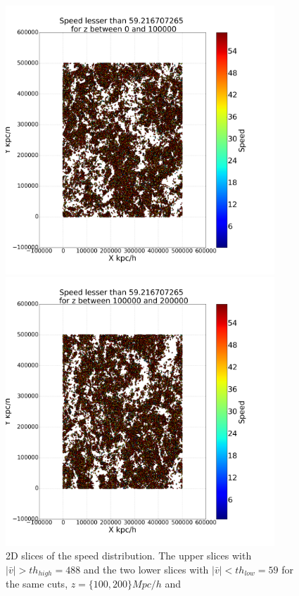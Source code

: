 \documentclass[12pt]{article}
\begin{document}
\begin{figure}[ht]
\begin{minipage}{.45\textwidth}
\end{minipage}
\begin{minipage}{.45\textwidth}
  \centering
  \includegraphics[width=0.9\textwidth]{graphs/scatter_magnitud_vel_59_lz_100000.png}
\end{minipage}
\begin{minipage}{.45\textwidth}
  \centering
  \includegraphics[width=0.9\textwidth]{graphs/scatter_magnitud_vel_59_lz_200000.png}
\end{minipage}
\caption{2D slices of the speed distribution. The upper slices with $|\bar{v}| > th_{high} = 488$ and the two lower slices with $|\bar{v}| < th_{low} = 59$ for the same cuts, $z = \{100, 200 \} Mpc/h$ and }\label{fig:2D_slices_thresh}
\end{figure}
\FloatBarrier
\end{document}
